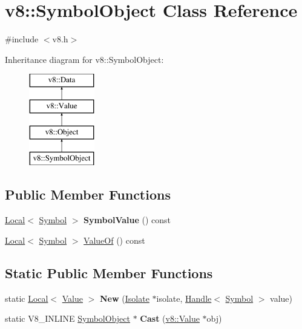 \hypertarget{classv8_1_1_symbol_object}{}\section{v8\+:\+:Symbol\+Object Class Reference}
\label{classv8_1_1_symbol_object}


{\ttfamily \#include $<$v8.\+h$>$}

Inheritance diagram for v8\+:\+:Symbol\+Object\+:\begin{figure}[H]
\begin{center}
\leavevmode
\includegraphics[height=4.000000cm]{classv8_1_1_symbol_object}
\end{center}
\end{figure}
\subsection*{Public Member Functions}
\begin{DoxyCompactItemize}
\item 
\hypertarget{classv8_1_1_symbol_object_abae1f1d54533c784d2665bbb5b20f5b4}{}\hyperlink{classv8_1_1_local}{Local}$<$ \hyperlink{classv8_1_1_symbol}{Symbol} $>$ {\bfseries Symbol\+Value} () const \label{classv8_1_1_symbol_object_abae1f1d54533c784d2665bbb5b20f5b4}

\item 
\hyperlink{classv8_1_1_local}{Local}$<$ \hyperlink{classv8_1_1_symbol}{Symbol} $>$ \hyperlink{classv8_1_1_symbol_object_a4a3b439c6784a4a8d9bdc5a246e12b85}{Value\+Of} () const 
\end{DoxyCompactItemize}
\subsection*{Static Public Member Functions}
\begin{DoxyCompactItemize}
\item 
\hypertarget{classv8_1_1_symbol_object_a74dfdb8fdd78b14f860e3b20dc7bdc9d}{}static \hyperlink{classv8_1_1_local}{Local}$<$ \hyperlink{classv8_1_1_value}{Value} $>$ {\bfseries New} (\hyperlink{classv8_1_1_isolate}{Isolate} $\ast$isolate, \hyperlink{classv8_1_1_handle}{Handle}$<$ \hyperlink{classv8_1_1_symbol}{Symbol} $>$ value)\label{classv8_1_1_symbol_object_a74dfdb8fdd78b14f860e3b20dc7bdc9d}

\item 
\hypertarget{classv8_1_1_symbol_object_aa98d7c4211bd55e347ee8169143fcec9}{}static V8\+\_\+\+I\+N\+L\+I\+N\+E \hyperlink{classv8_1_1_symbol_object}{Symbol\+Object} $\ast$ {\bfseries Cast} (\hyperlink{classv8_1_1_value}{v8\+::\+Value} $\ast$obj)\label{classv8_1_1_symbol_object_aa98d7c4211bd55e347ee8169143fcec9}

\end{DoxyCompactItemize}


